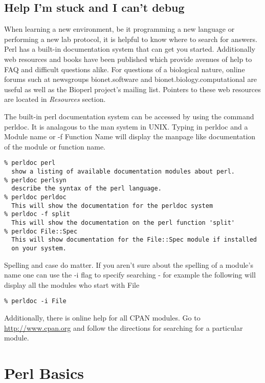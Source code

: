 \documentclass{article}
\begin{document}
\subsection{Help I'm stuck and I can't debug}

When learning a new environment, be it programming a new language or
performing a new lab protocol, it is helpful to know where to search
for answers.  Perl has a built-in documentation system that can get
you started.  Additionally web resources and books have been published
which provide avenues of help to FAQ and difficult questions alike.
For questions of a biological nature, online forums such at newsgroups
bionet.software and bionet.biology.computational are useful as well as
the Bioperl project's mailing list.  Pointers to these web resources
are located in \emph{\it Resources} section.

\par
The built-in perl documentation system can be accessed by using the
command perldoc.  It is analagous to the man system in UNIX.  Typing
in perldoc and a Module name or -f Function Name will display the
manpage like documentation of the module or function name.  

\par
\begin{verbatim}
% perldoc perl
  show a listing of available documentation modules about perl.  
% perldoc perlsyn 
  describe the syntax of the perl language. 
% perldoc perldoc
  This will show the documentation for the perldoc system
% perldoc -f split
  This will show the documentation on the perl function 'split'
% perldoc File::Spec
  This will show documentation for the File::Spec module if installed
  on your system.
\end{verbatim}

\par
Spelling and case do matter.  If you aren't sure about the spelling of a
module's name one can use the -i flag to specify searching - for
example the following will display all the modules who start with File
\par
\begin{verbatim} 
% perldoc -i File
\end{verbatim}

Additionally, there is online help for all CPAN modules.  Go to
\url{http://www.cpan.org} and follow the directions for
searching for a particular module.

\section{Perl Basics}
\end{document}
